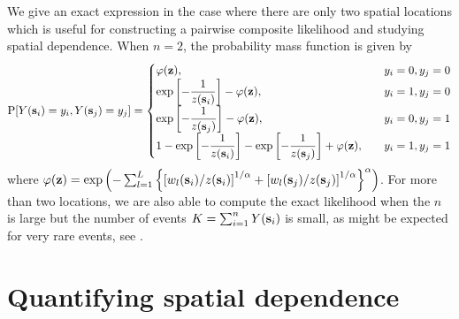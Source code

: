 \documentclass[12pt]{article}
\begin{document}
We give an exact expression in the case where there are only two spatial locations which is useful for constructing a pairwise composite likelihood \citep{Padoan2010} and studying spatial dependence.
When $n = 2$, the probability mass function is given by
\begin{align} \label{rbeq:biv}
\text{P}[Y(\mathbf{s}_i) = y_i, Y(\mathbf{s}_j) = y_j] = \begin{cases}
\varphi(\mathbf{z}), &y_i = 0, y_j = 0\\
\exp\left[ - \displaystyle \frac{ 1 }{ z(\mathbf{s}_i) }  \right] - \varphi(\mathbf{z}), &y_i = 1, y_j = 0 \\
\exp\left[ -  \displaystyle \frac{ 1 }{ z(\mathbf{s}_j) } \right] - \varphi(\mathbf{z}), &y_i = 0, y_j = 1 \\
1 - \exp\left[ -  \displaystyle \frac{ 1 }{ z(\mathbf{s}_i) } \right] - \exp \left[ - \displaystyle \frac{ 1 }{ z(\mathbf{s}_j) } \right] + \varphi(\mathbf{z}), \quad &y_i = 1, y_j = 1
\end{cases}
\end{align}
where $\varphi(\mathbf{z}) = \exp \left( -  \sum_{ l = 1 }^{ L } \left\{ \left[ w_{ l }(\mathbf{s}_i) / z(\mathbf{s}_i)  \right]^{1/\alpha} + \left[ w_{l }(\mathbf{s}_j) / z(\mathbf{s}_j) \right]^{1/\alpha} \right\}^{\alpha} \right)$.
For more than two locations, we are also able to compute the exact likelihood when the $n$ is large but the number of events $K =  \sum_{i = 1}^n Y(\mathbf{s}_i)$ is small, as might be expected for very rare events, see .


\section{Quantifying spatial dependence} \label{rbs:spatdep}
\end{document}

